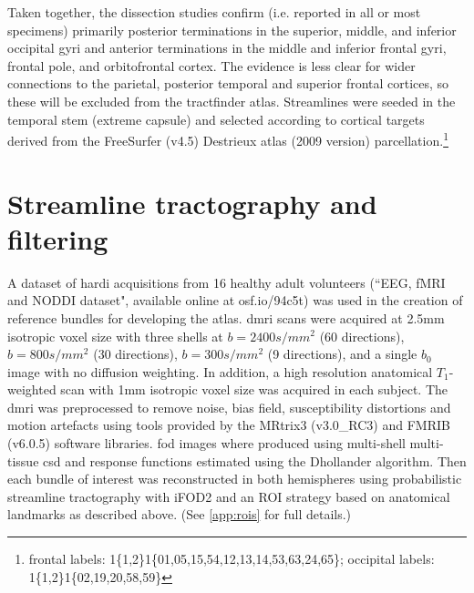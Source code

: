 Taken together, the dissection studies confirm (i.e. reported in all or most specimens) primarily posterior terminations in the superior, middle, and inferior occipital gyri and anterior terminations in the middle and inferior frontal gyri, frontal pole, and orbitofrontal cortex.
The evidence is less clear for wider connections to the parietal, posterior temporal and superior frontal cortices, so these will be excluded from the tractfinder atlas.
Streamlines were seeded in the temporal stem (extreme capsule) and selected according to cortical targets derived from the FreeSurfer (v4.5) Destrieux atlas\autocite{Destrieux2010} (2009 version) parcellation.\footnote[2]{frontal labels: 1\{1,2\}1\{01,05,15,54,12,13,14,53,63,24,65\}; occipital labels: 1\{1,2\}1\{02,19,20,58,59\}}

\section{Streamline tractography and filtering}

A dataset of \gls{hardi} acquisitions from 16 healthy adult volunteers (``EEG, fMRI and NODDI dataset",\autocite{Clayden2020} available online at osf.io/94c5t) was used in the creation of reference bundles for developing the atlas.
\Gls{dmri} scans were acquired at 2.5mm isotropic voxel size with three shells at $b=2400s/mm^2$ (60 directions), $b=800s/mm^2$ (30 directions), $b=300s/mm^2$ (9 directions), and a single $b_0$ image with no diffusion weighting.
In addition, a high resolution anatomical $T_1$-weighted scan with 1mm isotropic voxel size was acquired in each subject.
The \gls{dmri} was preprocessed to remove noise, bias field, susceptibility distortions and motion artefacts using tools provided by the MRtrix3 (v3.0\_RC3) and FMRIB (v6.0.5) software libraries.
\gls{fod} images where produced using multi-shell multi-tissue \gls{csd}\autocite{Jeurissen2014,Tournier2019} and response functions estimated using the Dhollander algorithm.\autocite{Dhollander2016}
Then each bundle of interest was reconstructed in both hemispheres using probabilistic streamline tractography with iFOD2 \autocite{Tournier2010} and an ROI strategy based on anatomical landmarks as described above. (See \ref{app:rois} for full details.)


